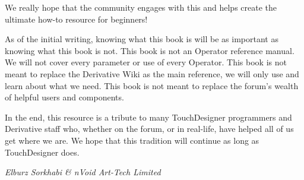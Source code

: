 \begin{fullwidth}
We really hope that the community engages with this and helps create the ultimate how-to resource for beginners!

As of the initial writing, knowing what this book is will be as important as knowing what this book is not. This book is not an Operator reference manual. We will not cover every parameter or use of every Operator. This book is not meant to replace the Derivative Wiki as the main reference, we will only use and learn about what we need. This book is not meant to replace the forum's wealth of helpful users and components.

In the end, this resource is a tribute to many TouchDesigner programmers and Derivative staff who, whether on the forum, or in real-life, have helped all of us get where we are. We hope that this tradition will continue as long as TouchDesigner does. 

\vspace{10mm}


\textit{Elburz Sorkhabi \& nVoid Art-Tech Limited}

\end{fullwidth}

\vspace{15mm}

